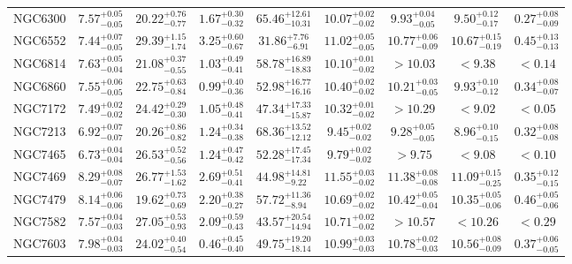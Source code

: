 \documentclass[onecolumn]{mn2e}
\begin{document}
{\begin{center}
\begin{longtable}{lcccccccc}
NGC6300 & $7.57_{-0.05}^{+0.05}$ & $20.22_{-0.77}^{+0.76}$ & $1.67_{-0.32}^{+0.30}$ &$65.46_{-10.31}^{+12.61}$ & $10.07_{-0.02}^{+0.02}$ & $9.93_{-0.05}^{+0.04}$ & $9.50_{-0.17}^{+0.12}$ & $0.27_{-0.09}^{+0.08}$ \\
NGC6552 & $7.44_{-0.05}^{+0.07}$ & $29.39_{-1.74}^{+1.15}$ & $3.25_{-0.67}^{+0.60}$ &$31.86_{-6.91}^{+7.76}$ & $11.02_{-0.05}^{+0.05}$ & $10.77_{-0.09}^{+0.06}$ & $10.67_{-0.19}^{+0.15}$ & $0.45_{-0.13}^{+0.13}$ \\
NGC6814 & $7.63_{-0.04}^{+0.05}$ & $21.08_{-0.55}^{+0.37}$ & $1.03_{-0.41}^{+0.49}$ &$58.78_{-18.83}^{+16.89}$ & $10.10_{-0.02}^{+0.01}$ & $>10.03$ & $<9.38$ & $<0.14$ \\
NGC6860 & $7.55_{-0.05}^{+0.06}$ & $22.75_{-0.84}^{+0.63}$ & $0.99_{-0.36}^{+0.40}$ &$52.98_{-16.16}^{+16.77}$ & $10.40_{-0.02}^{+0.02}$ & $10.21_{-0.05}^{+0.03}$ & $9.93_{-0.12}^{+0.10}$ & $0.34_{-0.07}^{+0.08}$ \\
NGC7172 & $7.49_{-0.02}^{+0.02}$ & $24.42_{-0.30}^{+0.29}$ & $1.05_{-0.41}^{+0.48}$ &$47.34_{-15.87}^{+17.33}$ & $10.32_{-0.02}^{+0.01}$ & $>10.29$ & $<9.02$ & $<0.05$ \\
NGC7213 & $6.92_{-0.07}^{+0.07}$ & $20.26_{-0.82}^{+0.86}$ & $1.24_{-0.38}^{+0.34}$ &$68.36_{-12.12}^{+13.52}$ & $9.45_{-0.02}^{+0.02}$ & $9.28_{-0.05}^{+0.05}$ & $8.96_{-0.15}^{+0.10}$ & $0.32_{-0.08}^{+0.08}$ \\
NGC7465 & $6.73_{-0.04}^{+0.04}$ & $26.53_{-0.56}^{+0.52}$ & $1.24_{-0.42}^{+0.47}$ &$52.28_{-17.34}^{+17.45}$ & $9.79_{-0.02}^{+0.02}$ & $>9.75$ & $<9.08$ & $<0.10$ \\
NGC7469 & $8.29_{-0.07}^{+0.08}$ & $26.77_{-1.62}^{+1.53}$ & $2.69_{-0.41}^{+0.51}$ &$44.98_{-9.22}^{+14.81}$ & $11.55_{-0.02}^{+0.03}$ & $11.38_{-0.08}^{+0.08}$ & $11.09_{-0.25}^{+0.15}$ & $0.35_{-0.15}^{+0.12}$ \\
NGC7479 & $8.14_{-0.06}^{+0.06}$ & $19.62_{-0.69}^{+0.73}$ & $2.20_{-0.27}^{+0.38}$ &$57.72_{-8.94}^{+11.36}$ & $10.69_{-0.02}^{+0.02}$ & $10.42_{-0.04}^{+0.05}$ & $10.35_{-0.06}^{+0.05}$ & $0.46_{-0.06}^{+0.05}$ \\
NGC7582 & $7.57_{-0.03}^{+0.04}$ & $27.05_{-0.93}^{+0.53}$ & $2.09_{-0.43}^{+0.59}$ &$43.57_{-14.94}^{+20.54}$ & $10.71_{-0.02}^{+0.02}$ & $>10.57$ & $<10.26$ & $<0.29$ \\
NGC7603 & $7.98_{-0.03}^{+0.04}$ & $24.02_{-0.54}^{+0.40}$ & $0.46_{-0.40}^{+0.45}$ &$49.75_{-18.14}^{+19.20}$ & $10.99_{-0.03}^{+0.03}$ & $10.78_{-0.03}^{+0.02}$ & $10.56_{-0.09}^{+0.08}$ & $0.37_{-0.05}^{+0.06}$ \\

\end{longtable}
\end{center}}
\end{document}
